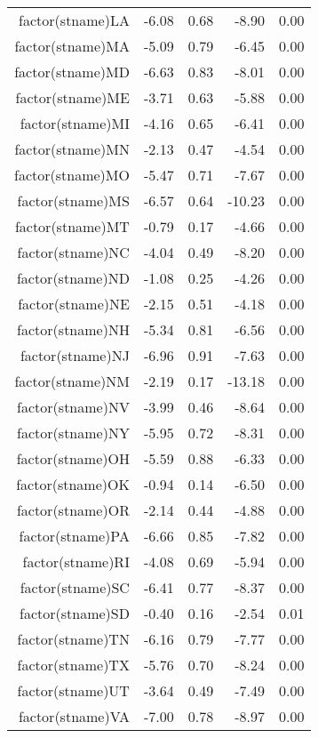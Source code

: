 \begin{table}[ht]
\begin{tabular}{rrrrr}
  factor(stname)LA & -6.08 & 0.68 & -8.90 & 0.00 \\ 
  factor(stname)MA & -5.09 & 0.79 & -6.45 & 0.00 \\ 
  factor(stname)MD & -6.63 & 0.83 & -8.01 & 0.00 \\ 
  factor(stname)ME & -3.71 & 0.63 & -5.88 & 0.00 \\ 
  factor(stname)MI & -4.16 & 0.65 & -6.41 & 0.00 \\ 
  factor(stname)MN & -2.13 & 0.47 & -4.54 & 0.00 \\ 
  factor(stname)MO & -5.47 & 0.71 & -7.67 & 0.00 \\ 
  factor(stname)MS & -6.57 & 0.64 & -10.23 & 0.00 \\ 
  factor(stname)MT & -0.79 & 0.17 & -4.66 & 0.00 \\ 
  factor(stname)NC & -4.04 & 0.49 & -8.20 & 0.00 \\ 
  factor(stname)ND & -1.08 & 0.25 & -4.26 & 0.00 \\ 
  factor(stname)NE & -2.15 & 0.51 & -4.18 & 0.00 \\ 
  factor(stname)NH & -5.34 & 0.81 & -6.56 & 0.00 \\ 
  factor(stname)NJ & -6.96 & 0.91 & -7.63 & 0.00 \\ 
  factor(stname)NM & -2.19 & 0.17 & -13.18 & 0.00 \\ 
  factor(stname)NV & -3.99 & 0.46 & -8.64 & 0.00 \\ 
  factor(stname)NY & -5.95 & 0.72 & -8.31 & 0.00 \\ 
  factor(stname)OH & -5.59 & 0.88 & -6.33 & 0.00 \\ 
  factor(stname)OK & -0.94 & 0.14 & -6.50 & 0.00 \\ 
  factor(stname)OR & -2.14 & 0.44 & -4.88 & 0.00 \\ 
  factor(stname)PA & -6.66 & 0.85 & -7.82 & 0.00 \\ 
  factor(stname)RI & -4.08 & 0.69 & -5.94 & 0.00 \\ 
  factor(stname)SC & -6.41 & 0.77 & -8.37 & 0.00 \\ 
  factor(stname)SD & -0.40 & 0.16 & -2.54 & 0.01 \\ 
  factor(stname)TN & -6.16 & 0.79 & -7.77 & 0.00 \\ 
  factor(stname)TX & -5.76 & 0.70 & -8.24 & 0.00 \\ 
  factor(stname)UT & -3.64 & 0.49 & -7.49 & 0.00 \\ 
  factor(stname)VA & -7.00 & 0.78 & -8.97 & 0.00 \\ 

\end{tabular}
\end{table}

